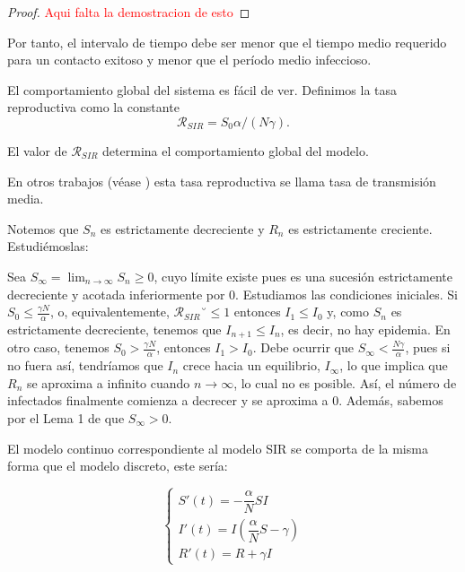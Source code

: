 \begin{proof}
\textcolor{red}{Aqui falta la demostracion de esto}
\end{proof}

Por tanto, el intervalo de tiempo debe ser menor que el tiempo medio requerido para un contacto exitoso y menor que el período medio infeccioso.

El comportamiento global del sistema es fácil de ver. Definimos la tasa reproductiva como la constante 
$$\mathcal{R}_{SIR}=S_0 \alpha/(N\gamma ).$$

El valor de $\mathcal{R}_{SIR}$ determina el comportamiento global del modelo.

En otros trabajos (véase \cite{demongeotSIEpidemicModel}) esta tasa reproductiva se llama tasa de transmisión media.

Notemos que $S_n$ es estrictamente decreciente y $R_n$ es estrictamente creciente. Estudiémoslas:

Sea $S_\infty=\lim_{n\rightarrow\infty} S_n\geq 0$, cuyo límite existe pues es una sucesión estrictamente decreciente y acotada inferiormente por $0$. Estudiamos las condiciones iniciales. Si $S_0\leq \frac{\gamma N}{\alpha}$, o, equivalentemente, $\mathcal{R}_{SIR}˘\leq 1$ entonces $I_1\leq I_0$ y, como $S_n$ es estrictamente decreciente, tenemos que $I_{n+1}\leq I_n$, es decir, no hay epidemia. En otro caso, tenemos $S_0> \frac{\gamma N}{\alpha}$, entonces $I_1>I_0$. Debe ocurrir que $S_\infty <\frac{N\gamma}{\alpha}$, pues si no fuera así, tendríamos que $I_n$ crece hacia un equilibrio, $I_\infty$, lo que implica que $R_n$ se aproxima a infinito cuando $n\rightarrow\infty$, lo cual no es posible. Así, el número de infectados finalmente comienza a decrecer y se aproxima a $0$. Además, sabemos por el Lema 1 de \cite{allenDiscretetimeSISIR1994} que $S_\infty>0$.

El modelo continuo correspondiente al modelo SIR se comporta de la misma forma que el modelo discreto, este sería:

\begin{equation}
\label{eqn: modelo_SIR_continuo}
\begin{cases}
S'(t) = -\dfrac{\alpha}{N}SI \\
I'(t) = I\left(\dfrac{\alpha}{N}S-\gamma \right) \\
R'(t) = R+\gamma I
\end{cases}
\end{equation}

